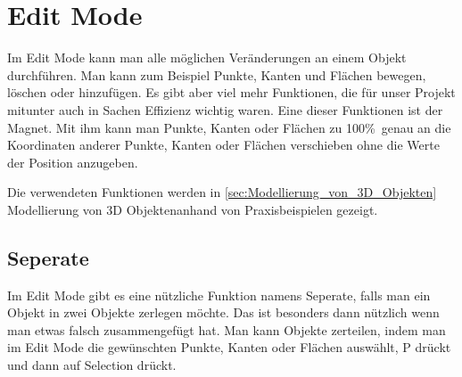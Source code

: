 \section{Edit Mode}
Im Edit Mode kann man alle möglichen Veränderungen an einem Objekt durchführen. Man kann zum Beispiel Punkte, Kanten und Flächen bewegen, löschen oder hinzufügen.
Es gibt aber viel mehr Funktionen, die für unser Projekt mitunter auch in Sachen Effizienz wichtig waren. Eine dieser Funktionen ist der Magnet. Mit ihm kann man Punkte, Kanten oder Flächen zu 100\%\ genau an
die Koordinaten anderer Punkte, Kanten oder Flächen verschieben ohne die Werte der Position anzugeben.

Die verwendeten Funktionen werden in  \autoref{sec:Modellierung_von_3D_Objekten} \dq  Modellierung von 3D Objekten\dq anhand von
Praxisbeispielen gezeigt.

\subsection{Seperate}
Im Edit Mode gibt es eine nützliche Funktion namens Seperate, falls man ein Objekt in zwei Objekte zerlegen möchte.
Das ist besonders dann nützlich wenn man etwas falsch zusammengefügt hat.
Man kann Objekte zerteilen, indem man im Edit Mode die gewünschten Punkte, Kanten oder Flächen auswählt, P drückt und
dann auf Selection drückt.